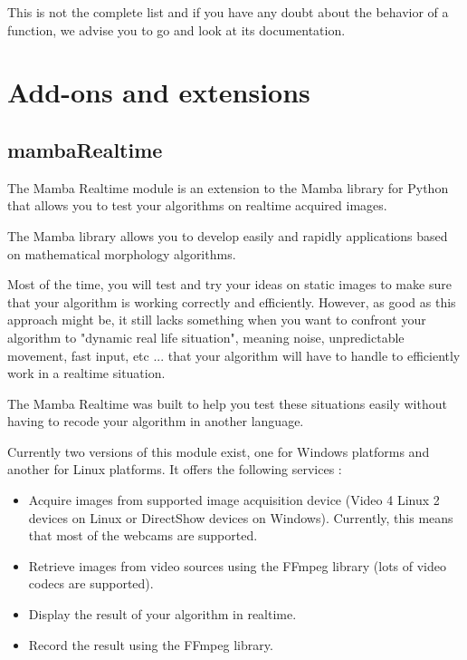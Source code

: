 \documentclass[a4paper,10pt,oneside]{article}
\begin{document}
This is not the complete list and if you have any doubt about the behavior
of a function, we advise you to go and look at its documentation.

\pagebreak

\section{Add-ons and extensions}
\subsection{mambaRealtime}

The Mamba Realtime module is an extension to the Mamba library for Python that 
allows you to test your algorithms on realtime acquired images.

The Mamba library allows you to develop easily and rapidly applications based on 
mathematical morphology algorithms. 

Most of the time, you will test and try your ideas on static images to make sure 
that your algorithm is working correctly and efficiently. However, as good as 
this approach might be, it still lacks something when you want to confront your 
algorithm to "dynamic real life situation", meaning noise, unpredictable 
movement, fast input, etc ... that your algorithm will have to handle to 
efficiently work in a realtime situation.

The Mamba Realtime was built to help you test these situations easily without 
having to recode your algorithm in another language.

Currently two versions of this module exist, one for Windows platforms and 
another for Linux platforms. It offers the following services :

\begin{itemize}
\item Acquire images from supported image acquisition device (Video 4 Linux 2
devices on Linux or DirectShow devices on Windows). Currently, this means that
most of the webcams are 
supported.
\item Retrieve images from video sources using the FFmpeg library (lots of video
codecs are supported).
\item Display the result of your algorithm in realtime.
\item Record the result using the FFmpeg library.
\end{itemize}

\end{document}
